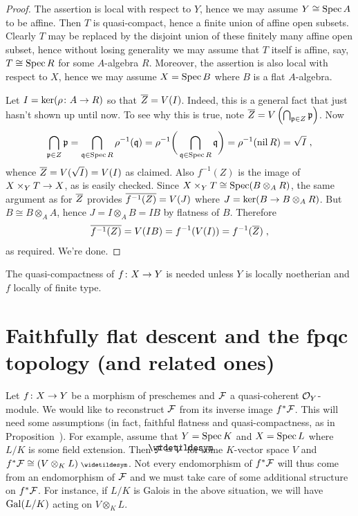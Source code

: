 \documentclass[a4paper,parskip=half,numbers=enddot, DIV=12]{scrreprt}
\begin{document}
\begin{proof}
	The assertion is local with respect to $Y$, hence we may assume $Y\cong\operatorname{Spec} A$ to be affine. Then $T$ is quasi-compact, hence a finite union of affine open subsets. Clearly $T$ may be replaced by the disjoint union of these finitely many affine open subset, hence without losing generality we may assume that $T$ itself is affine, say, $T\cong\operatorname{Spec} R$ for some $A$-algebra $R$. Moreover, the assertion is also local with respect to $X$, hence we may assume $X=\operatorname{Spec} B$ where $B$ is a flat $A$-algebra.
	
	Let $I=\ker(\rho\colon A\morphism R)$ so that $\overline{Z}=V(I)$. Indeed, this is a general fact that just hasn't shown up until now. To see why this is true, note $\overline{Z}=V\left(\bigcap_{\mathfrak{p}\in Z}\mathfrak{p}\right)$. Now 
	\begin{align*}
		\bigcap_{\mathfrak{p}\in Z}\mathfrak{p}=\bigcap_{\mathfrak{q}\in \operatorname{Spec} R}\rho^{-1}(\mathfrak{q})=\rho^{-1}\bigg(\bigcap_{\mathfrak{q}\in \operatorname{Spec} R}\mathfrak{q}\bigg)=\rho^{-1}(\operatorname{nil} R)=\sqrt{I}\;,
	\end{align*}
	whence $\overline{Z}=V(\sqrt{I})=V(I)$ as claimed. Also $f^{-1}(Z)$ is the image of $X\times_YT\morphism X$, as is easily checked. Since $X\times_YT\cong \operatorname{Spec}(B\otimes_AR)$, the same argument as for $\overline{Z}$ provides $\overline{f^{-1}(Z)}=V(J)$ where $J=\ker(B\morphism B\otimes_AR)$. But $B\cong B\otimes_AA$, hence $J=I\otimes_AB=IB$ by flatness of $B$. Therefore
	\begin{align*}
		\overline{f^{-1}(Z)}=V(IB)=f^{-1}(V(I))=f^{-1}(\overline{Z})\;,
	\end{align*}
	as required. We're done.
\end{proof}
\begin{rem}
	The quasi-compactness of $f\colon X\morphism Y$ is needed unless $Y$ is locally noetherian and $f$ locally of finite type.
\end{rem}
\section{Faithfully flat descent and the fpqc topology (and related ones)}
Let $f\colon X\morphism Y$ be a morphism of preschemes and $\mathcal{F}$ a quasi-coherent $\mathcal{O}_Y$-module. We would like to reconstruct $\mathcal{F}$ from its inverse image $f^*\mathcal{F}$. This will need some assumptions (in fact, faithful flatness and quasi-compactness, as in Proposition~). For example, assume that $Y=\operatorname{Spec} K$ and $X=\operatorname{Spec} L$ where $L/K$ is some field extension. Then $\Ff=\snake{V}$ for some $K$-vector space $V$ and $f^*\Ff\cong (V\otimes_KL)^\qcmod$. Not every endomorphism of $f^*\mathcal{F}$ will thus come from an endomorphism of $\mathcal{F}$ and we must take care of some additional structure on $f^*\mathcal{F}$. For instance, if $L/K$ is Galois in the above situation, we will have $\operatorname{Gal}(L/K)$ acting on $V\otimes_KL$.
\end{document}
